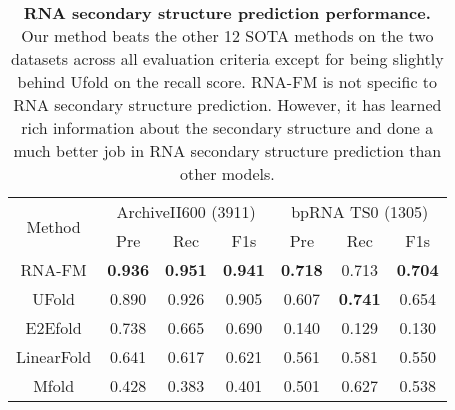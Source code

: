 \begin{table}[t]
\centering
\caption{\textbf{RNA secondary structure prediction performance.} Our method beats the other 12 SOTA methods on the two datasets across all evaluation criteria except for being slightly behind Ufold on the recall score. RNA-FM is not specific to RNA secondary structure prediction. However, it has learned rich information about the secondary structure and done a much better job in RNA secondary structure prediction than other models.}
\label{Tab.ss}
\begin{threeparttable}
\begin{tabular}{ccccccc} 
\toprule
\multirow{2}{*}{Method}     & \multicolumn{3}{c}{ArchiveII600 (3911)} & \multicolumn{3}{c}{bpRNA TS0 (1305)}  \\ 
\cmidrule(lr){2-4}\cmidrule(lr){5-7}
                            & Pre\tnote{a}   & Rec   & F1s                     & Pre   & Rec   & F1s                   \\ 
\midrule
RNA-FM & \textbf{0.936} & \textbf{0.951} & \textbf{0.941}                   & \textbf{0.718} & 0.713 & \textbf{0.704}                \\
\midrule
UFold                       & 0.890 & 0.926 & 0.905                   & 0.607 & \textbf{0.741} & 0.654                 \\
E2Efold                     & 0.738 & 0.665 & 0.690                   & 0.140 & 0.129 & 0.130                 \\
LinearFold                  & 0.641 & 0.617 & 0.621                   & 0.561 & 0.581 & 0.550                 \\
Mfold                       & 0.428 & 0.383 & 0.401                   & 0.501 & 0.627 & 0.538                 \\

\end{tabular}
\end{threeparttable}
\end{table}
